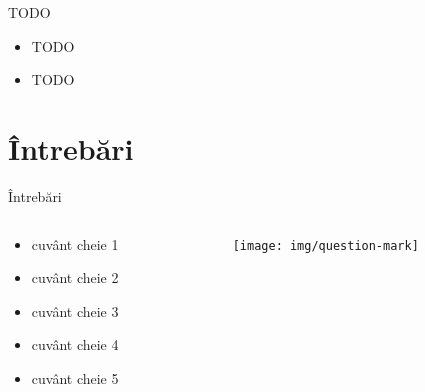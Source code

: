 \documentclass{beamer}
\begin{document}
\begin{frame}{TODO}
	\begin{itemize}
		\item TODO
		\item TODO
	\end{itemize}
\end{frame}

\section{\^{I}ntrebări}

\begin{frame}{Întrebări}
  \begin{columns}
    \begin{column}[t]{0.5\textwidth}
      \begin{itemize}
        \item cuvânt cheie 1
        \item cuvânt cheie 2
        \item cuvânt cheie 3
        \item cuvânt cheie 4
        \item cuvânt cheie 5
      \end{itemize}
    \end{column}
    \begin{column}[c]{0.5\textwidth}
      \begin{figure}
        \texttt{[image: img/question-mark]}
      \end{figure}
    \end{column}
  \end{columns}
\end{frame}
\end{document}
